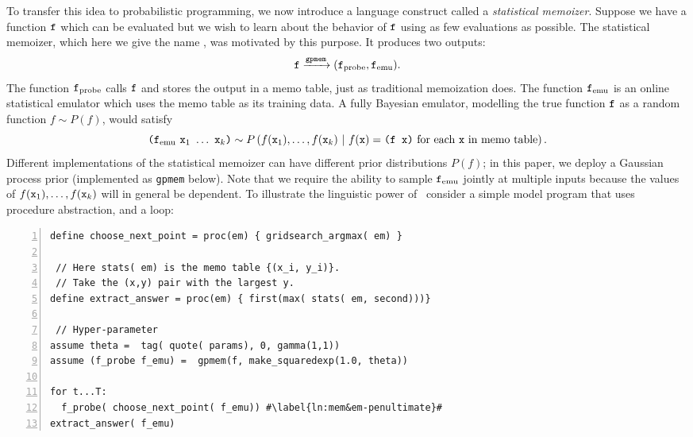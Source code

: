 To transfer this idea to probabilistic programming, we now introduce a language construct called a
\emph{statistical memoizer}.  Suppose we have a function $\texttt{f}$ which can be evaluated 
but we wish to learn about the behavior of $\texttt{f}$ using as
few evaluations as possible.  The statistical memoizer, which here we give the
name \gpmem, was motivated by this purpose.  It produces two outputs:
\[ \texttt{f} \xrightarrow{\texttt{gpmem}} (\texttt{f}_{\textrm{probe}}, \texttt{f}_{\textrm{emu}}). \]
The function $\texttt{f}_{\textrm{probe}}$ calls $\texttt{f}$ and stores the output in a memo
table, just as traditional memoization does.  The function $\texttt{f}_{\textrm{emu}}$ is
an online statistical emulator which uses the memo table as its training
data.  A fully Bayesian emulator, modelling the true function $\texttt{f}$ as a
random function $f \sim P(f)$, would satisfy
\[
\texttt{(}\ftt_\emu\ \xtt_1\ \ldots\ \xtt_k\texttt{)}
\sim
P\pn{
  f(\xtt_1), \ldots, f(\xtt_k)
  \mvert
  \text{$f(\xtt) = \texttt{(f x)}$ for each $\xtt$ in memo table}
}.
\]
Different implementations of the statistical memoizer can have
different prior distributions $P(f)$; in this paper, we deploy a Gaussian process
prior (implemented as \texttt{gpmem} below).  Note that we require the ability
to sample $\texttt{f}_{\textrm{emu}}$ jointly at multiple inputs because the values of
$f(\texttt{x}_1),\ldots,f(\texttt{x}_k)$ will in general be dependent.
To illustrate the linguistic power of \gpmem\, consider a simple model program
that uses \gpmem\, procedure abstraction, and a loop:

\begin{minipage}{\textwidth}
\small
\begin{lstlisting}[frame=single,escapechar=\#,numbers=left,numbersep=5pt,numberstyle=\tiny\color{gray}]
define choose_next_point = proc(em) { gridsearch_argmax( em) }

 // Here stats( em) is the memo table {(x_i, y_i)}.
 // Take the (x,y) pair with the largest y.
define extract_answer = proc(em) { first(max( stats( em, second)))}
 
 // Hyper-parameter 
assume theta =  tag( quote( params), 0, gamma(1,1))
assume (f_probe f_emu) =  gpmem(f, make_squaredexp(1.0, theta))

for t...T:
  f_probe( choose_next_point( f_emu)) #\label{ln:mem&em-penultimate}#
extract_answer( f_emu)    
\end{lstlisting}
\end{minipage}


